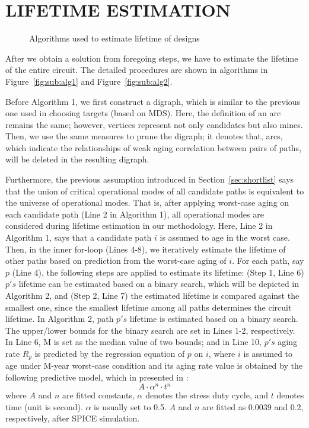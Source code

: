 \section{LIFETIME ESTIMATION}
\begin{figure*}[!ht]
    \centering
    \hspace{1.6cm}
    \caption{Algorithms used to estimate lifetime of designs}
    \label{fig:en}
\end{figure*}

After we obtain a solution from foregoing steps, we have to estimate the lifetime of the entire circuit. The detailed procedures are shown in algorithms in Figure~\ref{fig:sub:alg1} and Figure~\ref{fig:sub:alg2}.

Before Algorithm 1, we first construct a digraph, which is similar to the previous one used in choosing targets (based on MDS). Here, the definition of an arc remains the same; however, vertices represent not only candidates but also mines. Then, we use the same measures to prune the digraph; it denotes that, arcs, which indicate the relationships of weak aging correlation between pairs of paths, will be deleted in the resulting digraph.

Furthermore, the previous assumption introduced in Section~\ref{sec:shortlist} says that the union of critical operational modes of all candidate paths is equivalent to the universe of operational modes. That is, after applying worst-case aging on each candidate path (Line 2 in Algorithm 1), all operational modes are considered during lifetime estimation in our methodology. Here, Line 2 in Algorithm 1, says that a candidate path $i$ is assumed to age in the worst case. Then, in the inner for-loop (Lines 4-8), we iteratively estimate the lifetime of other paths based on prediction from the worst-case aging of $i$. For each path, say $p$ (Line 4), the following steps are applied to estimate its lifetime: (Step 1, Line 6) $p's$ lifetime can be estimated based on a binary search, which will be depicted in Algorithm 2, and (Step 2, Line 7) the estimated lifetime is compared against the smallest one, since the smallest lifetime among all paths determines the circuit lifetime.
In Algorithm 2, path $p's$ lifetime is estimated based on a binary search. The upper/lower bounds for the binary search are set in Lines 1-2, respectively. In Line 6, M is set as the median value of two bounds; and in Line 10, $p's$ aging rate $R_{p}$ is predicted by the regression equation of $p$ on $i$, where $i$ is assumed to age under M-year worst-case condition and its aging rate value is obtained by the following predictive model, which in presented in \cite{wang2007efficient}:
\begin{equation}
	A \cdot \alpha^n \cdot t^n 
\end{equation}
where $A$ and $n$ are fitted constants, $\alpha$ denotes the stress duty cycle, and $t$ denotes time (unit is second). $\alpha$ is usually set to 0.5. $A$ and $n$ are fitted as 0.0039 and 0.2, respectively, after SPICE simulation.

